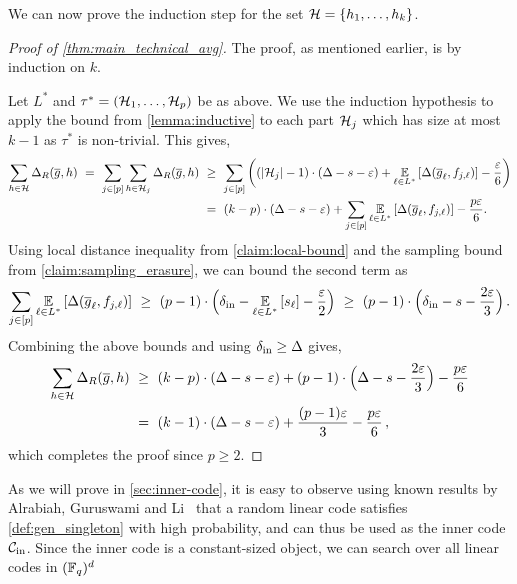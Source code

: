 %
We can now prove the induction step for the set $\calH = \inbraces{h_1, \ldots, h_k}$.
%
\begin{proof}[Proof of \cref{thm:main_technical_avg}]
%
%
The proof, as mentioned earlier, is by induction on $k$.

Let $L^*$ and $\tau^* = (\calH_1, \ldots, \calH_p)$ be as above. We use the induction hypothesis to apply the bound from \cref{lemma:inductive} to each part $\calH_j$ which has size at most $k-1$ as $\tau^*$ is non-trivial. This gives,
%
\begin{align*}
\sum_{h\in \calH} \Delta_R(\erase{g},h) 
~=~ \sum_{j\in [p]} \sum_{h\in \calH_j} \Delta_R(\erase{g},h) 
&~\geq~ \sum_{j\in [p]} \inparen{(|\calH_j|-1) \cdot \inparen{\Delta - s - \eps} + \Ex{\ell \in L^*}{\Delta(\gl, \fjl)} - \frac{\eps}{6}}\\
&~=~  (k-p) \cdot \inparen{\Delta - s - \eps} + \sum_{j\in [p]} \Ex{\ell \in L^*}{\Delta(\gl, \fjl)} - \frac{p\eps}{6}.
\end{align*}
%
Using local distance inequality from \cref{claim:local-bound} and the sampling bound from \cref{claim:sampling_erasure}, we can bound the second term as
\[
\sum_{j\in [p]} \Ex{\ell \in L^*}{\Delta(\gl, \fjl)} 
~\geq~ (p-1) \cdot \parens[\Big]{\delta_{\inn} - \Ex{\ell \in L^*}{s_{\ell}} - \frac{\eps}{2}}
~\geq~ (p-1) \cdot  \parens[\Big]{\delta_{\inn} - s - \frac{2\eps}{3}} \mper
\]
Combining the above bounds and using $\delta_{\inn} \geq \Delta$ gives,
\begin{align*}
\sum_{h\in \calH} \Delta_R(\erase{g},h) 
&~\geq~ (k-p) \cdot (\Delta - s - \eps) + (p-1) \cdot  \parens[\Big]{\Delta - s - \frac{2\eps}{3}} - \frac{p\eps}{6} \\
&~=~ (k-1) \cdot (\Delta - s - \eps) + \frac{(p-1)\eps}{3} - \frac{p\eps}{6} \mcom
\end{align*}
which completes the proof since $p \geq 2$.
%
\end{proof}
%
As we will prove in \cref{sec:inner-code}, it is easy to observe using known results by Alrabiah, Guruswami and Li~\cite{AGL24} that a random
linear code satisfies \cref{def:gen_singleton} with high probability, and can thus be used as the
inner code $\calC_{\inn}$. 
%
Since the inner code is a constant-sized object, we can search over all linear codes in $(\F_q)^d$
